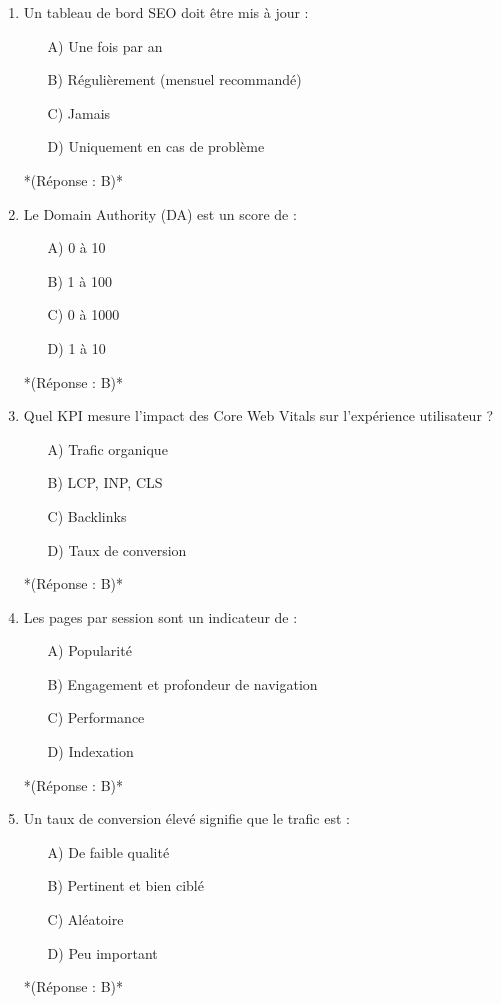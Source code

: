\documentclass[12pt,a4paper,twoside]{report}
\begin{document}
\begin{enumerate}
    \item Un tableau de bord SEO doit être mis à jour :
    \begin{itemize}
        \item[A)] Une fois par an
        \item[B)] Régulièrement (mensuel recommandé)
        \item[C)] Jamais
        \item[D)] Uniquement en cas de problème
    \end{itemize}
    *(Réponse : B)*

    \item Le Domain Authority (DA) est un score de :
    \begin{itemize}
        \item[A)] 0 à 10
        \item[B)] 1 à 100
        \item[C)] 0 à 1000
        \item[D)] 1 à 10
    \end{itemize}
    *(Réponse : B)*

    \item Quel KPI mesure l'impact des Core Web Vitals sur l'expérience utilisateur ?
    \begin{itemize}
        \item[A)] Trafic organique
        \item[B)] LCP, INP, CLS
        \item[C)] Backlinks
        \item[D)] Taux de conversion
    \end{itemize}
    *(Réponse : B)*

    \item Les pages par session sont un indicateur de :
    \begin{itemize}
        \item[A)] Popularité
        \item[B)] Engagement et profondeur de navigation
        \item[C)] Performance
        \item[D)] Indexation
    \end{itemize}
    *(Réponse : B)*

    \item Un taux de conversion élevé signifie que le trafic est :
    \begin{itemize}
        \item[A)] De faible qualité
        \item[B)] Pertinent et bien ciblé
        \item[C)] Aléatoire
        \item[D)] Peu important
    \end{itemize}
    *(Réponse : B)*


\end{enumerate}
\end{document}
